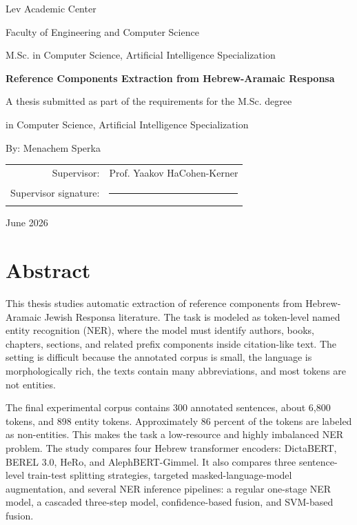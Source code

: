 \documentclass[12pt,a4paper]{report}
\begin{document}
\begin{titlepage}
\vspace*{0.4cm}
\begin{center}
{\Large Lev Academic Center}\par
{\large Faculty of Engineering and Computer Science}\par
{\large M.Sc. in Computer Science, Artificial Intelligence Specialization}\par
\vspace{3.1cm}
{\LARGE\bfseries Reference Components Extraction from Hebrew-Aramaic Responsa}\par
\vspace{2.1cm}
{\large A thesis submitted as part of the requirements for the M.Sc. degree}\par
{\large in Computer Science, Artificial Intelligence Specialization}\par
\vspace{2.3cm}
{\large By: Menachem Sperka}\par
\vspace{1.7cm}
\begin{tabular}{rl}
Supervisor: & Prof. Yaakov HaCohen-Kerner \\
Supervisor signature: & \rule{6cm}{0.4pt} \\
\end{tabular}
\vfill
{\large June 2026}\par
\end{center}
\end{titlepage}

\chapter*{Abstract}
This thesis studies automatic extraction of reference components from Hebrew-Aramaic Jewish Responsa literature. The task is modeled as token-level named entity recognition (NER), where the model must identify authors, books, chapters, sections, and related prefix components inside citation-like text. The setting is difficult because the annotated corpus is small, the language is morphologically rich, the texts contain many abbreviations, and most tokens are not entities.

The final experimental corpus contains 300 annotated sentences, about 6,800 tokens, and 898 entity tokens. Approximately 86 percent of the tokens are labeled as non-entities. This makes the task a low-resource and highly imbalanced NER problem. The study compares four Hebrew transformer encoders: DictaBERT, BEREL 3.0, HeRo, and AlephBERT-Gimmel. It also compares three sentence-level train-test splitting strategies, targeted masked-language-model augmentation, and several NER inference pipelines: a regular one-stage NER model, a cascaded three-step model, confidence-based fusion, and SVM-based fusion.
\end{document}

